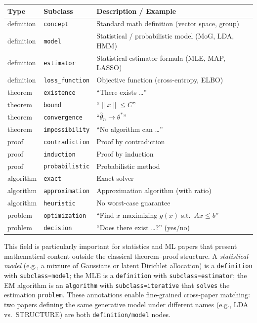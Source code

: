 \begin{center}
\small
\begin{tabular}{llp{7cm}}
\toprule
\textbf{Type} & \textbf{Subclass} & \textbf{Description / Example} \\
\midrule
definition & \texttt{concept} & Standard math definition (vector space, group) \\
definition & \texttt{model} & Statistical / probabilistic model (MoG, LDA, HMM) \\
definition & \texttt{estimator} & Statistical estimator formula (MLE, MAP, LASSO) \\
definition & \texttt{loss\_function} & Objective function (cross-entropy, ELBO) \\
\midrule
theorem & \texttt{existence} & ``There exists \ldots'' \\
theorem & \texttt{bound} & ``$\|x\| \leq C$'' \\
theorem & \texttt{convergence} & ``$\hat\theta_n \to \theta^*$'' \\
theorem & \texttt{impossibility} & ``No algorithm can \ldots'' \\
\midrule
proof & \texttt{contradiction} & Proof by contradiction \\
proof & \texttt{induction} & Proof by induction \\
proof & \texttt{probabilistic} & Probabilistic method \\
\midrule
algorithm & \texttt{exact} & Exact solver \\
algorithm & \texttt{approximation} & Approximation algorithm (with ratio) \\
algorithm & \texttt{heuristic} & No worst-case guarantee \\
\midrule
problem & \texttt{optimization} & ``Find $x$ maximizing $g(x)$ s.t.\ $Ax \leq b$'' \\
problem & \texttt{decision} & ``Does there exist \ldots?'' (yes/no) \\
\bottomrule
\end{tabular}
\end{center}

This field is particularly important for statistics and ML papers that
present mathematical content outside the classical theorem--proof structure.
A \emph{statistical model} (e.g., a mixture of Gaussians or latent Dirichlet
allocation) is a \texttt{definition} with \texttt{subclass=model}; the MLE
is a \texttt{definition} with \texttt{subclass=estimator}; the EM algorithm
is an \texttt{algorithm} with \texttt{subclass=iterative} that
\texttt{solves} the estimation \texttt{problem}. These annotations enable
fine-grained cross-paper matching: two papers defining the same generative
model under different names (e.g., LDA vs.\ STRUCTURE) are both
\texttt{definition/model} nodes.

